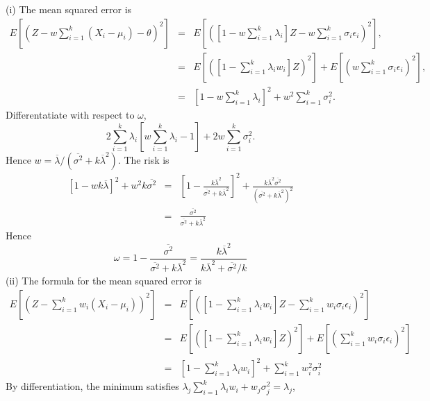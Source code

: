 \documentclass{article}
\makeatletter
\theoremstyle{plain}
\theoremstyle{plain}
\theoremstyle{definition}
\theoremstyle{remark}
\theoremstyle{definition}
\theoremstyle{plain}
\theoremstyle{plain}
\theoremstyle{definition}
\newenvironment{proof}[1][\protect\proofname]{\par
	\normalfont\topsep6\p@\@plus6\p@\relax
	\trivlist
	\itemindent\parindent
	\item[\hskip\labelsep\scshape #1]\ignorespaces
}{%
	\endtrivlist\@endpefalse
}
\providecommand{\proofname}{Proof}
\makeatother
\begin{document}
\begin{proof}[Proof of Proposition \ref{prop:Z-reliabiltiy}]\label{proof:Z-reliability}


(i) The mean squared error is
\begin{eqnarray*}
E\left[\left(Z-w\sum_{i=1}^{k}\left(X_{i}-\mu_{i}\right)-\theta\right)^{2}\right] & = & E\left[\left(\left[1-w\sum_{i=1}^{k}\lambda_{i}\right]Z-w\sum_{i=1}^{k}\sigma_{i}\epsilon_{i}\right)^{2}\right],\\
 & = & E\left[\left(\left[1-\sum_{i=1}^{k}\lambda_{i}w_{i}\right]Z\right)^{2}\right]+E\left[\left(w\sum_{i=1}^{k}\sigma_{i}\epsilon_{i}\right)^{2}\right],\\
 & = & \left[1-w\sum_{i=1}^{k}\lambda_{i}\right]^{2}+w^{2}\sum_{i=1}^{k}\sigma_{i}^{2}.
\end{eqnarray*}
Differentatiate with respect to $\omega$,
\[
2\sum_{i=1}^{k}\lambda_{i}\left[w\sum_{i=1}^{k}\lambda_{i}-1\right]+2w\sum_{i=1}^{k}\sigma_{i}^{2}.
\]
Hence $w=\overline{\lambda}/\left(\overline{\sigma^{2}}+k\overline{\lambda}^{2}\right)$.
The risk is
\begin{eqnarray*}
\left[1-wk\overline{\lambda}\right]^{2}+w^{2}k\overline{\sigma^{2}} & = & \left[1-\frac{k\overline{\lambda}^{2}}{\overline{\sigma^{2}}+k\overline{\lambda}^{2}}\right]^{2}+\frac{k\overline{\lambda}^{2}\overline{\sigma^{2}}}{\left(\overline{\sigma^{2}}+k\overline{\lambda}^{2}\right)^{2}}\\
 & = & \frac{\overline{\sigma^{2}}}{\overline{\sigma^{2}}+k\overline{\lambda}^{2}}
\end{eqnarray*}
Hence
\[
\omega = 1-\frac{\overline{\sigma^{2}}}{\overline{\sigma^{2}}+k\overline{\lambda}^{2}}=\frac{k\overline{\lambda}^{2}}{k\overline{\lambda}^{2}+\overline{\sigma^{2}}/k}
\]
(ii) The formula for the mean squared error is
\begin{eqnarray*}
E\left[\left(Z-\sum_{i=1}^{k}w_{i}\left(X_{i}-\mu_{i}\right)\right)^{2}\right] & = & E\left[\left(\left[1-\sum_{i=1}^{k}\lambda_{i}w_{i}\right]Z-\sum_{i=1}^{k}w_{i}\sigma_{i}\epsilon_{i}\right)^{2}\right]\\
 & = & E\left[\left(\left[1-\sum_{i=1}^{k}\lambda_{i}w_{i}\right]Z\right)^{2}\right]+E\left[\left(\sum_{i=1}^{k}w_{i}\sigma_{i}\epsilon_{i}\right)^{2}\right]\\
 & = & \left[1-\sum_{i=1}^{k}\lambda_{i}w_{i}\right]^{2}+\sum_{i=1}^{k}w_{i}^{2}\sigma_{i}^{2}
\end{eqnarray*}
By differentiation, the minimum satisfies $\lambda_{j}\sum_{i=1}^{k}\lambda_{i}w_{i}+w_{j}\sigma_{j}^{2}=\lambda_{j}$,

\end{proof}
\end{document}
